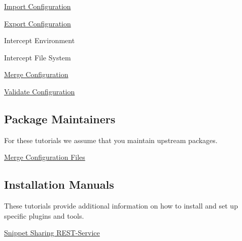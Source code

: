 \begin{DoxyItemize}
\item \hyperlink{doc_tutorials_import_md}{Import Configuration}
\item \hyperlink{doc_tutorials_export_md}{Export Configuration}
\item Intercept Environment
\item Intercept File System
\item \hyperlink{doc_tutorials_merge_md}{Merge Configuration}
\item \hyperlink{md_doc_tutorials_validation_doc_tutorials_validation_md}{Validate Configuration}
\end{DoxyItemize}

\subsection*{Package Maintainers}

For these tutorials we assume that you maintain upstream packages.


\begin{DoxyItemize}
\item \hyperlink{doc_tutorials_elektra-merge-integration_md}{Merge Configuration Files}
\end{DoxyItemize}

\subsection*{Installation Manuals}

These tutorials provide additional information on how to install and set up specific plugins and tools.


\begin{DoxyItemize}
\item \hyperlink{doc_tutorials_snippet-sharing-rest-service_md}{Snippet Sharing R\+E\+S\+T-\/\+Service} 
\end{DoxyItemize}